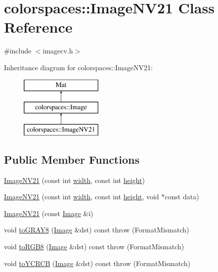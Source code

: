 \hypertarget{classcolorspaces_1_1_image_n_v21}{}\section{colorspaces\+:\+:Image\+N\+V21 Class Reference}
\label{classcolorspaces_1_1_image_n_v21}


{\ttfamily \#include $<$imagecv.\+h$>$}

Inheritance diagram for colorspaces\+:\+:Image\+N\+V21\+:\begin{figure}[H]
\begin{center}
\leavevmode
\includegraphics[height=3.000000cm]{classcolorspaces_1_1_image_n_v21}
\end{center}
\end{figure}
\subsection*{Public Member Functions}
\begin{DoxyCompactItemize}
\item 
\hyperlink{classcolorspaces_1_1_image_n_v21_a11da1ed1be50dc0c03ebe5816bf3f820}{Image\+N\+V21} (const int \hyperlink{classcolorspaces_1_1_image_ab80af7d4797110c23ed575b329ec7c4f}{width}, const int \hyperlink{classcolorspaces_1_1_image_a99a05ebd37f61215b2c3042ecaefdbfc}{height})
\item 
\hyperlink{classcolorspaces_1_1_image_n_v21_a95633670978884b2b8cef8faa1a2be18}{Image\+N\+V21} (const int \hyperlink{classcolorspaces_1_1_image_ab80af7d4797110c23ed575b329ec7c4f}{width}, const int \hyperlink{classcolorspaces_1_1_image_a99a05ebd37f61215b2c3042ecaefdbfc}{height}, void $\ast$const data)
\item 
\hyperlink{classcolorspaces_1_1_image_n_v21_a0802dcb928ee0130217bd94c52e3accc}{Image\+N\+V21} (const \hyperlink{classcolorspaces_1_1_image}{Image} \&i)
\item 
void \hyperlink{classcolorspaces_1_1_image_n_v21_a0df5a2e9fb72b96e27926690be766b64}{to\+G\+R\+A\+Y8} (\hyperlink{classcolorspaces_1_1_image}{Image} \&dst) const  throw (\+Format\+Mismatch)
\item 
void \hyperlink{classcolorspaces_1_1_image_n_v21_a2f516ceb85bd1151bed2fa940fee133c}{to\+R\+G\+B8} (\hyperlink{classcolorspaces_1_1_image}{Image} \&dst) const  throw (\+Format\+Mismatch)
\item 
void \hyperlink{classcolorspaces_1_1_image_n_v21_accca097e4cca85e511a1bedcba198549}{to\+Y\+C\+R\+CB} (\hyperlink{classcolorspaces_1_1_image}{Image} \&dst) const  throw (\+Format\+Mismatch)
\end{DoxyCompactItemize}
